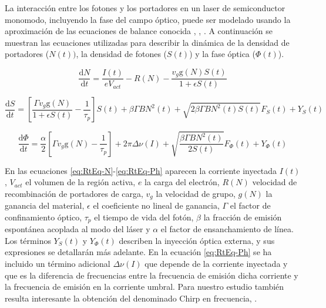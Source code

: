 La interacción entre los fotones y los portadores en un laser de semiconductor monomodo, incluyendo la fase del campo óptico, puede ser modelado usando la aproximación de las ecuaciones de balance conocida \cite{artSim}, \cite{schunk1986noise}, \cite{fatadin2006numerical}. A continuación se muestran las ecuaciones utilizadas para describir la dinámica de la densidad de portadores ($N(t))$,  la densidad de fotones ($S(t)$) y la fase óptica ($\Phi(t)$).

	\begin{equation}
		\frac{\mathrm{d} N}{\mathrm{d} t} = \frac{I(t)}{e V_{act}} - R(N) - \frac{v_g \textrm{g}(N)S(t)}{1 + \epsilon S(t)} 
		\label{eq:RtEq-N}
	\end{equation}

	\begin{equation}
		\frac{\mathrm{d} S}{\mathrm{d} t} = \left[ \frac{\Gamma v_g \textrm{g}(N)}{1 + \epsilon S(t)} - \frac{1}{\tau_p} \right] S(t) + \beta \Gamma BN^2 (t) + \sqrt{2 \beta \Gamma B N^2(t)S(t)} F_S(t) + Y_S(t)
		\label{eq:RtEq-S}
	\end{equation}

	\begin{equation}
		\frac{\mathrm{d} \Phi}{\mathrm{d} t} = \frac{\alpha}{2}\left[ \Gamma
        v_g \textrm{g}(N) - \frac{1}{\tau_p} \right] + 2\pi\Delta\nu(I) + \sqrt{\frac{\beta \Gamma B N^2(t)}{2 S(t)}} F_{\Phi} (t) + Y_{\Phi}(t)
		\label{eq:RtEq-Ph}
	\end{equation}

	En las ecuaciones \ref{eq:RtEq-N}-\ref{eq:RtEq-Ph} aparecen la corriente inyectada $I(t)$, $V_{act}$ el volumen de la región activa, $e$ la carga del electrón, $R(N)$ velocidad de recombinación de portadores de carga, $v_g$ la velocidad de grupo, $g(N)$ la ganancia del material, $\epsilon$ el coeficiente no lineal de ganancia, $\Gamma$ el factor de confinamiento óptico, $\tau_p$ el tiempo de vida del fotón, $\beta$ la fracción de emisión espontánea acoplada al modo del láser y $\alpha$ el factor de ensanchamiento de línea. Los términos $Y_S(t)$ y $Y_{\Phi}(t)$ describen la inyección óptica externa, y sus expresiones se detallarán más adelante. En la ecuación \ref{eq:RtEq-Ph} se ha incluido un término adicional $\Delta\nu(I)$ que depende de la corriente inyectada  y que es la diferencia de frecuencias entre la frecuencia de emisión dicha corriente y la frecuencia de emisión en la corriente umbral. Para nuestro estudio también resulta interesante la obtención del denominado Chirp en frecuencia, \chirp.

